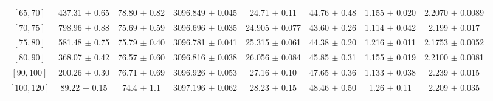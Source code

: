 \begin{tabular}{c||c|c|c|c|c|c|c}
$[65, 70]$ & 437.31 $\pm$ 0.65 & 78.80 $\pm$ 0.82 & 3096.849 $\pm$ 0.045 & 24.71 $\pm$ 0.11 & 44.76 $\pm$ 0.48 & 1.155 $\pm$ 0.020 & 2.2070 $\pm$ 0.0089\\
$[70, 75]$ & 798.96 $\pm$ 0.88 & 75.69 $\pm$ 0.59 & 3096.696 $\pm$ 0.035 & 24.905 $\pm$ 0.077 & 43.60 $\pm$ 0.26 & 1.114 $\pm$ 0.042 & 2.199 $\pm$ 0.017\\
$[75, 80]$ & 581.48 $\pm$ 0.75 & 75.79 $\pm$ 0.40 & 3096.781 $\pm$ 0.041 & 25.315 $\pm$ 0.061 & 44.38 $\pm$ 0.20 & 1.216 $\pm$ 0.011 & 2.1753 $\pm$ 0.0052\\
$[80, 90]$ & 368.07 $\pm$ 0.42 & 76.57 $\pm$ 0.60 & 3096.816 $\pm$ 0.038 & 26.056 $\pm$ 0.084 & 45.85 $\pm$ 0.31 & 1.155 $\pm$ 0.019 & 2.2100 $\pm$ 0.0081\\
$[90, 100]$ & 200.26 $\pm$ 0.30 & 76.71 $\pm$ 0.69 & 3096.926 $\pm$ 0.053 & 27.16 $\pm$ 0.10 & 47.65 $\pm$ 0.36 & 1.133 $\pm$ 0.038 & 2.239 $\pm$ 0.015\\
$[100, 120]$ & 89.22 $\pm$ 0.15 & 74.4 $\pm$ 1.1 & 3097.196 $\pm$ 0.062 & 28.23 $\pm$ 0.15 & 48.46 $\pm$ 0.50 & 1.26 $\pm$ 0.11 & 2.209 $\pm$ 0.035\\
\end{tabular}
